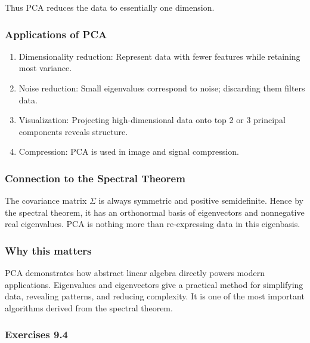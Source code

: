 \documentclass[
  12pt,
  a4paper,
]{article}
\begin{document}
Thus PCA reduces the data to essentially one dimension.

\subsubsection{Applications of PCA}\label{applications-of-pca}

\begin{enumerate}
\def\labelenumi{\arabic{enumi}.}
\item
  Dimensionality reduction: Represent data with fewer features while
  retaining most variance.
\item
  Noise reduction: Small eigenvalues correspond to noise; discarding
  them filters data.
\item
  Visualization: Projecting high-dimensional data onto top 2 or 3
  principal components reveals structure.
\item
  Compression: PCA is used in image and signal compression.
\end{enumerate}

\subsubsection{Connection to the Spectral
Theorem}\label{connection-to-the-spectral-theorem}

The covariance matrix \(\Sigma\) is always symmetric and positive
semidefinite. Hence by the spectral theorem, it has an orthonormal basis
of eigenvectors and nonnegative real eigenvalues. PCA is nothing more
than re-expressing data in this eigenbasis.

\subsubsection{Why this matters}\label{why-this-matters-35}

PCA demonstrates how abstract linear algebra directly powers modern
applications. Eigenvalues and eigenvectors give a practical method for
simplifying data, revealing patterns, and reducing complexity. It is one
of the most important algorithms derived from the spectral theorem.

\subsubsection{Exercises 9.4}\label{exercises-94}
\end{document}
